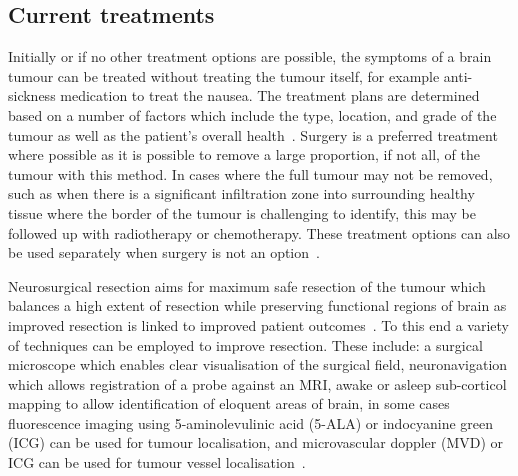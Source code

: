 \subsection{Current treatments}\label{sec:introtumourtreatments}
Initially or if no other treatment options are possible, the symptoms of a brain tumour can be treated without treating the tumour itself, for example anti-sickness medication to treat the nausea. The treatment plans are determined based on a number of factors which include the type, location, and grade of the tumour as well as the patient's overall health~\cite{NationalHealthService2023}. Surgery is a preferred treatment where possible as it is possible to remove a large proportion, if not all, of the tumour with this method. In cases where the full tumour may not be removed, such as when there is a significant infiltration zone into surrounding healthy tissue where the border of the tumour is challenging to identify, this may be followed up with radiotherapy or chemotherapy. These treatment options can also be used separately when surgery is not an option~\cite{MacmillanCancerSupport2019}. 

Neurosurgical resection aims for maximum safe resection of the tumour which balances a high extent of resection while preserving functional regions of brain as improved resection is linked to improved patient outcomes~\cite{Chanbour2022}. To this end a variety of techniques can be employed to improve resection. These include: a surgical microscope which enables clear visualisation of the surgical field, neuronavigation which allows registration of a probe against an MRI, awake or asleep sub-corticol mapping to allow identification of eloquent areas of brain, in some cases fluorescence imaging using 5-aminolevulinic acid (5-ALA) or indocyanine green (ICG) can be used for tumour localisation, and microvascular doppler (MVD) or ICG can be used for tumour vessel localisation~\cite{Chanbour2022, Catapano2018}.

